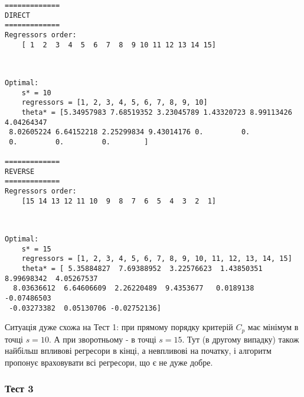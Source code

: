 \documentclass[11pt]{article}
\begin{document}
    \begin{Verbatim}[commandchars=\\\{\}]
=============
DIRECT
=============
Regressors order:
	[ 1  2  3  4  5  6  7  8  9 10 11 12 13 14 15]

    \end{Verbatim}

    \begin{center}
    \end{center}
    { \hspace*{\fill} \\}
    
    \begin{Verbatim}[commandchars=\\\{\}]
Optimal:
	s* = 10
	regressors = [1, 2, 3, 4, 5, 6, 7, 8, 9, 10]
	theta* = [5.34957983 7.68519352 3.23045789 1.43320723 8.99113426 4.04264347
 8.02605224 6.64152218 2.25299834 9.43014176 0.         0.
 0.         0.         0.        ]

=============
REVERSE
=============
Regressors order:
	[15 14 13 12 11 10  9  8  7  6  5  4  3  2  1]

    \end{Verbatim}

    \begin{center}
    \end{center}
    { \hspace*{\fill} \\}
    
    \begin{Verbatim}[commandchars=\\\{\}]
Optimal:
	s* = 15
	regressors = [1, 2, 3, 4, 5, 6, 7, 8, 9, 10, 11, 12, 13, 14, 15]
	theta* = [ 5.35884827  7.69388952  3.22576623  1.43850351  8.99698342  4.05267537
  8.03636612  6.64606609  2.26220489  9.4353677   0.0189138  -0.07486503
 -0.03273382  0.05130706 -0.02752136]

    \end{Verbatim}

    Ситуація дуже схожа на Тест 1: при прямому порядку критерій \(C_p\) має
мінімум в точці \(s=10\). А при зворотньому - в точці \(s=15\). Тут (в
другому випадку) також найбільш впливові регресори в кінці, а невпливові
на початку, і алгоритм пропонує враховувати всі регресори, що є не дуже
добре.

    \subsubsection{Тест 3}\label{ux442ux435ux441ux442-3}
\end{document}
